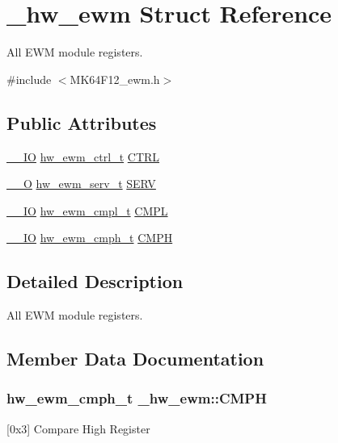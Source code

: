 \hypertarget{struct__hw__ewm}{}\section{\+\_\+hw\+\_\+ewm Struct Reference}
\label{struct__hw__ewm}


All E\+WM module registers.  




{\ttfamily \#include $<$M\+K64\+F12\+\_\+ewm.\+h$>$}

\subsection*{Public Attributes}
\begin{DoxyCompactItemize}
\item 
\hyperlink{core__sc300_8h_aec43007d9998a0a0e01faede4133d6be}{\+\_\+\+\_\+\+IO} \hyperlink{union__hw__ewm__ctrl}{hw\+\_\+ewm\+\_\+ctrl\+\_\+t} \hyperlink{struct__hw__ewm_ac8edf0c9d475db1c8bf516c1b42b4a78}{C\+T\+RL}
\item 
\hyperlink{core__sc300_8h_a7e25d9380f9ef903923964322e71f2f6}{\+\_\+\+\_\+O} \hyperlink{union__hw__ewm__serv}{hw\+\_\+ewm\+\_\+serv\+\_\+t} \hyperlink{struct__hw__ewm_a496cafa0c4c7857ae668b1f17a7d4944}{S\+E\+RV}
\item 
\hyperlink{core__sc300_8h_aec43007d9998a0a0e01faede4133d6be}{\+\_\+\+\_\+\+IO} \hyperlink{union__hw__ewm__cmpl}{hw\+\_\+ewm\+\_\+cmpl\+\_\+t} \hyperlink{struct__hw__ewm_abe87b37dd112e8bbe5023041258a0a6f}{C\+M\+PL}
\item 
\hyperlink{core__sc300_8h_aec43007d9998a0a0e01faede4133d6be}{\+\_\+\+\_\+\+IO} \hyperlink{union__hw__ewm__cmph}{hw\+\_\+ewm\+\_\+cmph\+\_\+t} \hyperlink{struct__hw__ewm_a2759192f703feb4efdf779143ce505e9}{C\+M\+PH}
\end{DoxyCompactItemize}


\subsection{Detailed Description}
All E\+WM module registers. 

\subsection{Member Data Documentation}
\subsubsection[{\texorpdfstring{C\+M\+PH}{CMPH}}]{ {\bf hw\+\_\+ewm\+\_\+cmph\+\_\+t} \+\_\+hw\+\_\+ewm\+::\+C\+M\+PH}\hypertarget{struct__hw__ewm_a2759192f703feb4efdf779143ce505e9}{}\label{struct__hw__ewm_a2759192f703feb4efdf779143ce505e9}
\mbox{[}0x3\mbox{]} Compare High Register 
